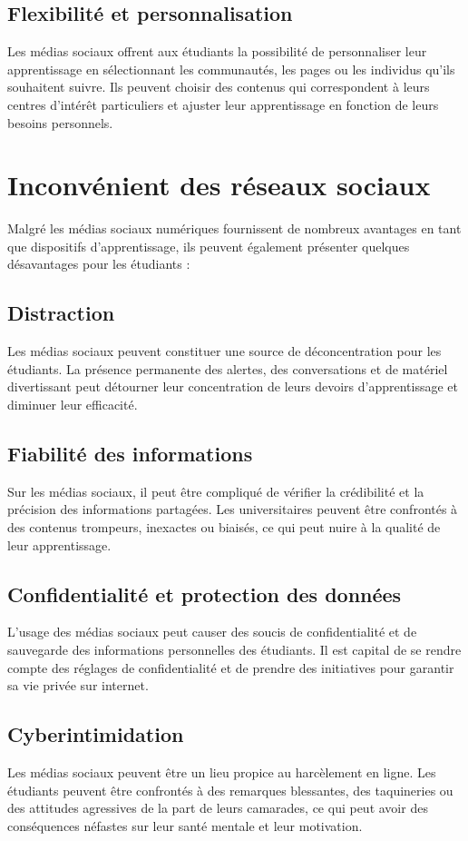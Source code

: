 \documentclass[12pt,a4paper,titlepage]{article}
\begin{document}
\subsection{Flexibilité et personnalisation }
Les médias sociaux offrent aux étudiants la possibilité de personnaliser leur apprentissage en sélectionnant les communautés, les pages ou les individus qu'ils souhaitent suivre. Ils peuvent choisir des contenus qui correspondent à leurs centres d'intérêt particuliers et ajuster leur apprentissage en fonction de leurs besoins personnels.
\section{Inconvénient des réseaux sociaux }
Malgré les médias sociaux numériques fournissent de nombreux avantages en tant que dispositifs d'apprentissage, ils peuvent également présenter quelques désavantages pour les étudiants :
\subsection{Distraction }
 Les médias sociaux peuvent constituer une source de déconcentration pour les étudiants. La présence permanente des alertes, des conversations et de matériel divertissant peut détourner leur concentration de leurs devoirs d'apprentissage et diminuer leur efficacité. 
 \subsection{Fiabilité des informations }
 Sur les médias sociaux, il peut être compliqué de vérifier la crédibilité et la précision des informations partagées. Les universitaires peuvent être confrontés à des contenus trompeurs, inexactes ou biaisés, ce qui peut nuire à la qualité de leur apprentissage.
 \subsection{Confidentialité et protection des données }
 L'usage des médias sociaux peut causer des soucis de confidentialité et de sauvegarde des informations personnelles des étudiants. Il est capital de se rendre compte des réglages de confidentialité et de prendre des initiatives pour garantir sa vie privée sur internet.
\subsection{Cyberintimidation } 
Les médias sociaux peuvent être un lieu propice au harcèlement en ligne. Les étudiants peuvent être confrontés à des remarques blessantes, des taquineries ou des attitudes agressives de la part de leurs camarades, ce qui peut avoir des conséquences néfastes sur leur santé mentale et leur motivation.
\end{document}
